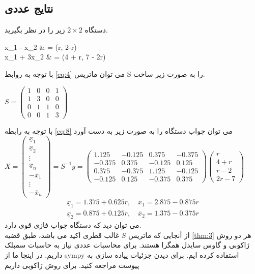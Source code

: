 
 	\subsection{ نتایج عددی} 
\begin{example}
	دستگاه  $2 \times 2 $ زیر را در نظر بگیرید. \\
	\begin{flalign}
	x_1 - x_2  & = (r, 2-r) \nonumber\\
	x_1 + 3x_2 & = (4 + r, 7 - 2r)\nonumber
	\end{flalign}
\end{example}
با توجه به روابط \ref{eq:4} می توان ماتریس S را به صورت زیر ساخت.\\
\begin{center}
	$
	S = 
	\begin{pmatrix}
	1 & 0 & 0 & 1 \\
	1 & 3 & 0 & 0 \\
	0 & 1 & 1 & 0 \\
	0 & 0 & 1 & 3 
	\end{pmatrix}
	$
\end{center}
با توجه به رابطه \ref{eq:8} می توان جواب دستگاه را به صورت زیر به دست آورد \\
$
X = 
\begin{pmatrix} 
\underline{x}_1\\
\underline{x}_2\\
\vdots\\
\underline{x}_n\\
-\overline{x}_1\\
\vdots\\
-\overline{x}_n	
\end{pmatrix} 
= S^{-1}{y} = 
\begin{pmatrix}
1.125 & -0.125 & 0.375 & -0.375 \\
-0.375 & 0.375 & -0.125 & 0.125 \\
0.375 & -0.375 & 1.125 & -0.125 \\
-0.125 & 0.125 & -0.375 & 0.375
\end{pmatrix}
\begin{pmatrix}
r \\
4 + r \\
r - 2\\
2r - 7
\end{pmatrix}
$
\begin{align}
\underline{x}_1 = 1.375 + 0.625r, \quad \overline{x}_1 = 2.875 - 0.875r\nonumber\\
\underline{x}_2 = 0.875 + 0.125r, \quad \overline{x}_2 = 1.375 - 0.375r\nonumber
\end{align}
می توان دید که دستگاه جواب فازی قوی دارد. \\ 
از آنجایی که ماتریس $ S $ غالب قطری اکید می باشد، طبق قضیه \ref{thm:3} هر دو روش ژاکوبی و گاوس سایدل همگرا هستند. برای محاسبات عددی نیاز به حاسبات سمبلک  داریم. در اینجا ما از sympy \cite{sympy} استفاده کرده ایم. برای دیدن جزئیات پیاده سازی به پیوست مراجعه کنید. برای روش ژاکوبی داریم \\

